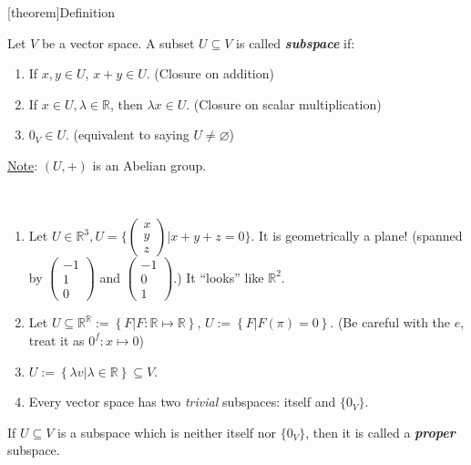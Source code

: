\documentclass[12pt]{report}
\theoremstyle{definition}
\begin{document}
[theorem]{Definition}
\begin{subspace}
    Let $V$ be a vector space. A subset $U \subseteq V$ is called \textbf{\emph{subspace}} if:
    \begin{enumerate}[label = (\arabic*)]
        \item If $x, y \in U$, $x + y \in U$. (Closure on addition)
        \item If $x \in U, \lambda \in \mathbb{R}$, then $\lambda x \in U$. (Closure on scalar multiplication)
        \item $0_V \in U$. (equivalent to saying $U \neq \varnothing$)
    \end{enumerate}
\end{subspace}

\underline{Note}: $(U, +)$ is an Abelian group.

\begin{ex}
    \,

    \begin{enumerate}[label = (\arabic*)]
        \item Let $U \in \mathbb{R}^{3}, U = \{\begin{pmatrix}
                x \\
                y \\
                z
        \end{pmatrix} | x + y + z = 0\}$.
        It is geometrically a plane! (spanned by $\begin{pmatrix}
                -1 \\
                1 \\
                0
        \end{pmatrix}$ and $\begin{pmatrix}
                -1 \\
                0 \\
                1
            \end{pmatrix}$.) It ``looks'' like $\mathbb{R}^{2}$.

        \item Let $U \subseteq \mathbb{R}^{\mathbb{R}} 
            := \left\{F | F:\mathbb{R} \mapsto \mathbb{R}\right\}$,
            $U := \left\{F | F(\pi) = 0\right\} $.
            (Be careful with the $e$, treat it as $0^{f}:x\mapsto 0$)

        \item $U := \left\{\lambda v | \lambda \in \mathbb{R}\right\} \subseteq V $.

        \item Every vector space has two \emph{trivial} subspaces: itself and $\{0_V\}$.
    \end{enumerate}

    If $U \subseteq V$ is a subspace which is neither itself nor $\{0_V\}$, then
    it is called a \textbf{\emph{proper}} subspace.
\end{ex}
\end{document}
